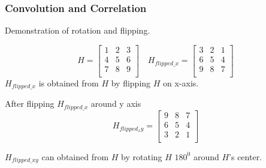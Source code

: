 \documentclass[english,11pt,table,handout]{beamer}
\begin{document}
{
	\frametitle{Convolution and Correlation}

	
	\begin{example}
		Demonstration of rotation and flipping.
		
		$$
		H = 
		\begin{bmatrix}
		1 & 2 & 3 \\
		4 & 5 & 6 \\
		7 & 8 & 9 \\
		\end{bmatrix}
		\quad
		H_{flipped\_x} = 
		\begin{bmatrix}
		3 & 2 & 1 \\
		6 & 5 & 4 \\
		9 & 8 & 7 \\
		\end{bmatrix}
		$$
		$H_{flipped\_x}$ is obtained from $H$ by flipping $H$ on x-axis.
		
		After flipping $H_{flipped\_x}$ around y axis
		$$
		H_{flipped_xy} = 
		\begin{bmatrix}
		9 & 8 & 7 \\
		6 & 5 & 4 \\
		3 & 2 & 1 \\
		\end{bmatrix}
		$$
		
		$H_{flipped\_xy}$ can obtained from $H$ by rotating $H$	$180^0$ around $H$'s center.
		\end{example}
}
\end{document}
